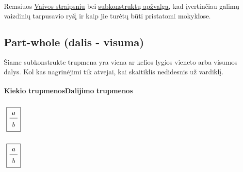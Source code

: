 \documentclass[a4paper]{article}
\begin{document}
Remsiuos \href{https://www.dropbox.com/s/jzcv5snd1stwnwk/Trupmena\%205\%20poziuriai\%20Vaiva\%202019-01-14.pptx?dl=0}{Vaivos straipsniu} bei \href{https://www.researchgate.net/publication/305180570\_Fractions\_A\_Concept\_Study}{subkonstruktų apžvalga}, kad įvertinčiau galimų vaizdinių tarpusavio ryšį ir kaip jie turėtų būti pristatomi mokyklose. 

\subsection{Part-whole (dalis - visuma)} 
Šiame subkonstrukte trupmena yra viena ar kelios lygios vieneto arba visumos dalys. Kol kas nagrinėjimi tik atvejai, kai skaitiklis nedidesnis už vardiklį.\\ \\
\phantom{xxxxxxxxxxxxxxxxxxxxx}\textbf{Kiekio trupmenos}\phantom{xxxxxxxxxxxxxxxxxxxxxxx}\textbf{Dalijimo trupmenos}\\ \\
\phantom{xxxxxxxxxxxxxxx}$\tikz[baseline]{\node(d22) {\boxed{\frac{\tikz[baseline]{\node(d20) {$a$}}}{\tikz[baseline]{\node(d21){$b$}}}}}}$
\phantom{xxxxxxxxxxxxxxxxxxxxxxxxxxxxxxxxxxxxxxxxxxx}$\tikz[baseline]{\node(d25) {\boxed{\frac{\tikz[baseline]{\node(d23) {$a$}}}{\tikz[baseline]{\node(d24){$b$}}}}}}$
\end{document}

